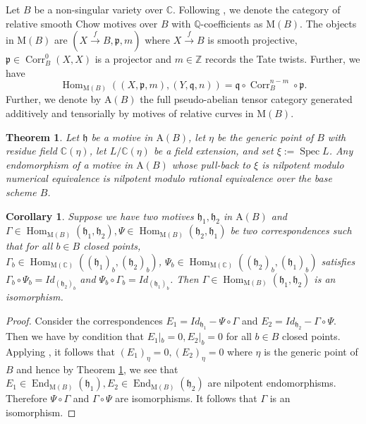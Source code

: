 \documentclass[11pt]{amsart}
\newtheorem{theorem}{Theorem}[section]
\newtheorem{corollary}{Corollary}[theorem]
\theoremstyle{definition}
\begin{document}
Let $B$ be a non-singular variety over $\mathbb C$. Following \cite{MR3851129}, we denote the category of relative smooth Chow motives over $B$ with $\mathbb Q$-coefficients as $\mathrm{M}(B)$. 
The objects in $\mathrm{M}(B)$ are $(X\xrightarrow{f}B, \mathfrak p, m)$ where $X\xrightarrow{f}B$ is smooth projective, $\mathfrak p \in \operatorname{Corr}_B ^0(X,X)$ is a projector and $m\in \mathbb Z$ records the Tate twists. Further, we have \begin{equation}
\operatorname{Hom}_{\mathrm{M}(B)} \left ( (X, \mathfrak p , m), (Y, \mathfrak q, n) \right ) = \mathfrak q\circ \operatorname{Corr}_B^{n-m}\circ \mathfrak p.
\end{equation}
Further, we denote by $\mathrm A(B)$ the full pseudo-abelian tensor category generated additively and tensorially by motives of relative curves in $\mathrm{M}(B)$. 

\begin{theorem}\cite[Corollary C]{MR3851129}\label{relative-nilpotence-theorem}
    Let $\mathfrak h $ be a motive in $\mathrm{A}(B)$, let $\eta$ be the generic point of $B$ with residue field $\mathbb C(\eta)$, let $L/{\mathbb C(\eta)}$ be a field extension, and set $\xi:=\operatorname{Spec}L$. Any endomorphism of a motive in $\mathrm A(B)$ whose pull-back to $\xi$ is nilpotent modulo numerical equivalence is nilpotent modulo rational equivalence over the base scheme $B$. 
\end{theorem}
\begin{corollary}\label{generic-isomorphism}
    Suppose we have two motives $\mathfrak h_1, \mathfrak h_2$ in $\mathrm A(B)$ and $\Gamma\in \operatorname{Hom}_{\mathrm{M}(B)}(\mathfrak h_1, \mathfrak h_2), \Psi\in \operatorname{Hom}_{\mathrm{M}(B)}(\mathfrak h_2, \mathfrak h_1)$
	 be two correspondences such that for all $b\in B$ closed points, \\
	 $\Gamma_b \in \operatorname{Hom}_{\mathrm{M}(\mathbb C)}\left((\mathfrak h_1)_b, (\mathfrak h_2)_b\right)$, $\Psi_b\in \operatorname{Hom}_{\mathrm{M}(\mathbb C)} \left ( (\mathfrak h_2)_b, (\mathfrak h_1)_b \right )$ satisfies $\Gamma_b \circ \Psi_b =Id_{(\mathfrak h_2)_b}$ and $\Psi_b\circ \Gamma_b=Id_{(\mathfrak h_1)_b}$. Then $\Gamma\in \operatorname{Hom}_{\mathrm{M}(B)}(\mathfrak h_1, \mathfrak h_2)$ is an isomorphism. 
\end{corollary}
\begin{proof}
    Consider the correspondences $E_1= Id_{\mathfrak h_1}-\Psi\circ \Gamma$ and $E_2= Id_{\mathfrak h_2}-\Gamma\circ \Psi$. 
	Then we have by condition that $E_1|_b=0, E_2|_b =0$ for all $b \in B$ closed points. 
	Applying \cite[Lemma 2.1.2]{voisin-cycles}, it follows that $(E_1)_\eta =0, (E_2)_\eta=0$ where $\eta$ is the generic point of $B$ and hence by Theorem \ref{relative-nilpotence-theorem}, we see that $E_1\in \operatorname{End}_{\mathrm{M}(B)}(\mathfrak h_1), E_2\in \operatorname{End}_{\mathrm{M}(B)}(\mathfrak h_2)$ are nilpotent endomorphisms. Therefore $\Psi\circ \Gamma$
 and $\Gamma\circ \Psi$ are isomorphisms. It follows that $\Gamma$ is an isomorphism. \end{proof}
 
\end{document}

